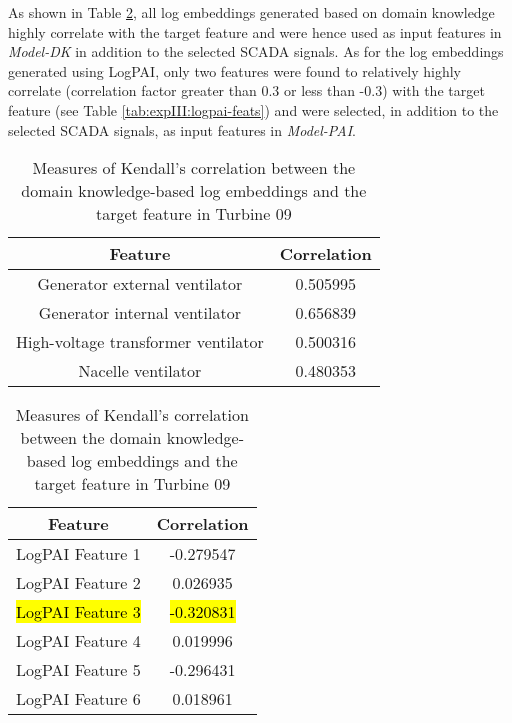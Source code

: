 As shown in Table \ref{tab:expIII:domain-knowledge-feats}, all log embeddings generated based on domain knowledge highly correlate with the target feature 
and were hence used as input features in \emph{Model-DK} in addition to the selected SCADA signals.
As for the log embeddings generated using LogPAI, only two features were found to relatively highly correlate (correlation factor greater than 0.3 or less than -0.3) 
with the target feature (see Table \ref{tab:expIII:logpai-feats}) and were selected, in addition to the selected SCADA signals, as input features in \emph{Model-PAI}.
\begin{table}[h]
    \parbox{.45\linewidth}{
    \centering
    \begin{tabular}{|c|c|}
        \hline
        Feature & Correlation\\
        \hline
        \multicolumn{1}{|m{0.25\textwidth}|}{Generator external ventilator} & 0.505995\\
        \hline
        \multicolumn{1}{|m{0.25\textwidth}|}{Generator internal ventilator} & 0.656839\\
        \hline
        \multicolumn{1}{|m{0.25\textwidth}|}{High-voltage transformer ventilator} & 0.500316\\
        \hline
        \multicolumn{1}{|m{0.25\textwidth}|}{Nacelle ventilator} & 0.480353\\
        \hline
    \end{tabular}
    \caption{Measures of Kendall's correlation between the domain knowledge-based log embeddings and the target feature in Turbine 09}
    \label{tab:expIII:domain-knowledge-feats}
    }
    \hfill
    \parbox{.45\linewidth}{
    \centering
    \begin{tabular}{|c|c|}
        \hline
        Feature & Correlation\\
        \hline
        \multicolumn{1}{|m{0.25\textwidth}|}{LogPAI Feature 1} & -0.279547\\
        \hline
        \multicolumn{1}{|m{0.25\textwidth}|}{LogPAI Feature 2} & 0.026935\\
        \hline
        \multicolumn{1}{|m{0.25\textwidth}|}{\hl{LogPAI Feature 3}} & \hl{-0.320831}\\
        \hline
        \multicolumn{1}{|m{0.25\textwidth}|}{LogPAI Feature 4} & 0.019996\\
        \hline
        \multicolumn{1}{|m{0.25\textwidth}|}{LogPAI Feature 5} & -0.296431\\
        \hline
        \multicolumn{1}{|m{0.25\textwidth}|}{LogPAI Feature 6} & 0.018961\\

\end{tabular}}
\end{table}
